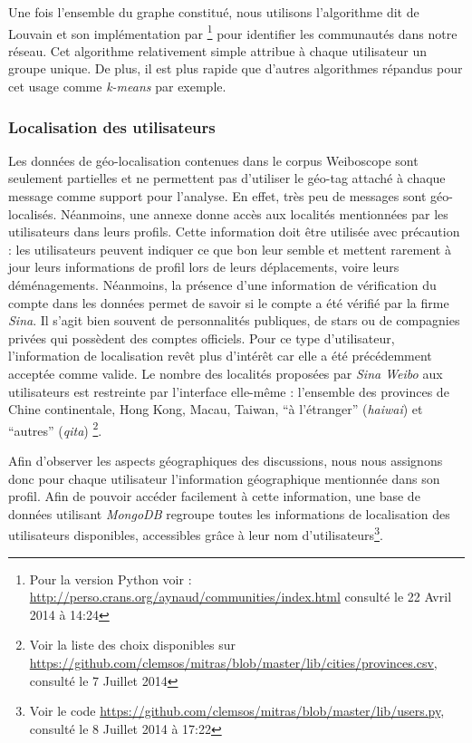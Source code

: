     Une fois l{\textquoteright}ensemble du graphe constitué, nous utilisons l{\textquoteright}algorithme dit de Louvain et son implémentation par \cite{Blondel2008}\footnote{Pour la version Python voir : \url{http://perso.crans.org/aynaud/communities/index.html} consulté le 22 Avril 2014 à 14:24} pour identifier les communautés dans notre réseau. Cet algorithme relativement simple attribue à chaque utilisateur un groupe unique. De plus, il est plus rapide que d'autres algorithmes répandus pour cet usage comme \textit{k-means} par exemple.

\subsubsection[Localisation des utilisateurs]{Localisation des utilisateurs}
\label{sec:geoloc}
    Les données de géo-localisation contenues dans le corpus Weiboscope sont seulement partielles et ne permettent pas d'utiliser le géo-tag attaché à chaque message comme support pour l'analyse. En effet, très peu de messages sont géo-localisés. Néanmoins, une annexe donne accès aux localités mentionnées par les utilisateurs dans leurs profils. Cette information doit être utilisée avec précaution : les utilisateurs peuvent indiquer ce que bon leur semble et mettent rarement à jour leurs informations de profil lors de leurs déplacements, voire leurs déménagements. Néanmoins, la présence d'une information de vérification du compte dans les données permet de savoir si le compte a été vérifié par la firme \textit{Sina}. Il s'agit bien souvent de personnalités publiques, de stars ou de compagnies privées qui possèdent des comptes officiels. Pour ce type d'utilisateur, l'information de localisation revêt plus d'intérêt car elle a été  précédemment acceptée comme valide. Le nombre des localités proposées par \textit{Sina Weibo} aux utilisateurs est restreinte par l{\textquoteright}interface  elle-même : l{\textquoteright}ensemble des provinces de Chine continentale, Hong Kong, Macau, Taiwan, {\textquotedblleft}à l{\textquoteright}étranger{\textquotedblright} (\textit{haiwai}) et {\textquotedblleft}autres{\textquotedblright} (\textit{qita}) \footnote{Voir la liste des choix disponibles sur \url{https://github.com/clemsos/mitras/blob/master/lib/cities/provinces.csv}, consulté le 7 Juillet 2014}.

    Afin d'observer les aspects géographiques des discussions, nous nous assignons donc pour chaque utilisateur l{\textquoteright}information géographique mentionnée dans son profil. Afin de pouvoir accéder facilement à cette information, une base de données utilisant \textit{MongoDB} regroupe toutes les informations de localisation des utilisateurs disponibles, accessibles grâce à leur nom d'utilisateurs\footnote{Voir le code \url{https://github.com/clemsos/mitras/blob/master/lib/users.py}, consulté le 8 Juillet 2014 à 17:22}.


